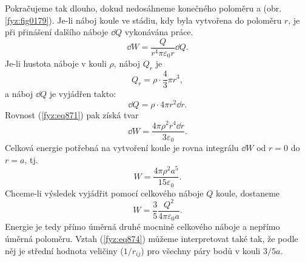     Pokračujeme tak dlouho, dokud nedosáhneme konečného poloměru a (obr. \ref{fyz:fig0179}). Je-li
    náboj koule ve stádiu, kdy byla vytvořena do poloměru \(r\), je při přinášení dalšího náboje
    \(\dd{Q}\) vykonávána práce.
    \begin{equation}\label{fyz:eq871}
      \dd{W}=\dfrac{Q}{r^4π\varepsilon_0r}\dd{Q}.
    \end{equation}
    Je-li hustota náboje v kouli \(ρ\), náboj \(Q_r\) je
    \begin{equation*}
      Q_r=ρ\cdot\dfrac{4}{3}πr^3,
    \end{equation*}
    a náboj \(\dd{Q}\) je vyjádřen takto:
    \begin{equation*}
      \dd{Q}=ρ⋅4πr^2\dd{r}.
    \end{equation*}
    Rovnost (\ref{fyz:eq871}) pak získá tvar
    \begin{equation}\label{fyz:eq872}
      \dd{W}=\dfrac{4πρ^2r^4\dd{r}}{3\varepsilon_0}.
    \end{equation}
    Celková energie potřebná na vytvoření koule je rovna integrálu \(\dd{W}\) od \(r = 0\) do \(r =
    a\), tj.
    \begin{equation}\label{fyz:eq873}
      W=\dfrac{4πρ^2a^5}{15\varepsilon_0}.
    \end{equation}
    Chceme-li výsledek vyjádřit pomocí celkového náboje \(Q\) koule, dostaneme
    \begin{equation}\label{fyz:eq874}
      W=\dfrac{3}{5}\dfrac{Q^2}{4π\varepsilon_0a}.
    \end{equation}
    Energie je tedy přímo úměrná druhé mocnině celkového náboje a nepřímo úměrná poloměru. Vztah
    (\ref{fyz:eq874}) můžeme interpretovat také tak, že podle něj je střední hodnota veličiny
    (\(1/r_{ij}\)) pro všechny páry bodů v kouli \(3/5 a\).

